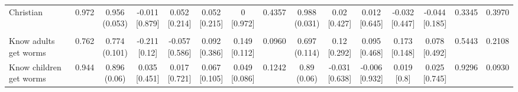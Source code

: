 {\begin{tabular}[t]{lcccccccccccccc}
\hspace{1em}Christian & 0.972 & \makecell[c]{0.956\\(0.053)} & \makecell[c]{-0.011\\{[0.879]}} & \makecell[c]{0.052\\{[0.214]}} & \makecell[c]{0.052\\{[0.215]}} & \makecell[c]{0\\{[0.972]}} & 0.4357 & \makecell[c]{0.988\\(0.031)} & \makecell[c]{0.02\\{[0.427]}} & \makecell[c]{0.012\\{[0.645]}} & \makecell[c]{-0.032\\{[0.447]}} & \makecell[c]{-0.044\\{[0.185]}} & 0.3345 & 0.3970\\
\addlinespace[0.3em]
\hline
\multicolumn{15}{l}{\textit{\textbf{Panel C: Deworming knowledge, $N=252$}}}\\
\hline
\hspace{1em}Know adults get worms & 0.762 & \makecell[c]{0.774\\(0.101)} & \makecell[c]{-0.211\\{[0.12]}} & \makecell[c]{-0.057\\{[0.586]}} & \makecell[c]{0.092\\{[0.386]}} & \makecell[c]{0.149\\{[0.112]}} & 0.0960 & \makecell[c]{0.697\\(0.114)} & \makecell[c]{0.12\\{[0.292]}} & \makecell[c]{0.095\\{[0.468]}} & \makecell[c]{0.173\\{[0.148]}} & \makecell[c]{0.078\\{[0.492]}} & 0.5443 & 0.2108\\
\hspace{1em}Know children get worms & 0.944 & \makecell[c]{0.896\\(0.06)} & \makecell[c]{0.035\\{[0.451]}} & \makecell[c]{0.017\\{[0.721]}} & \makecell[c]{0.067\\{[0.105]}} & \makecell[c]{0.049\\{[0.086]}} & 0.1242 & \makecell[c]{0.89\\(0.06)} & \makecell[c]{-0.031\\{[0.638]}} & \makecell[c]{-0.006\\{[0.932]}} & \makecell[c]{0.019\\{[0.8]}} & \makecell[c]{0.025\\{[0.745]}} & 0.9296 & 0.0930\\

\end{tabular}}
